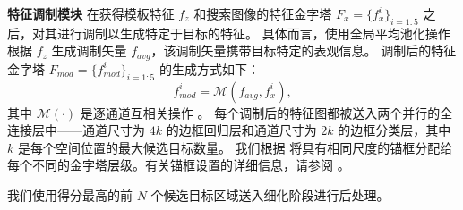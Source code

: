 \textbf{特征调制模块} 在获得模板特征 $f_{z}$ 和搜索图像的特征金字塔 $F_{x} = \{f_{x}^i\}_{i=1:5}$ 之后，对其进行调制以生成特定于目标的特征。
具体而言，使用全局平均池化操作根据 $f_{z}$ 生成调制矢量 $f_{avg}$，该调制矢量携带目标特定的表观信息。
调制后的特征金字塔 $F_{mod} = \{f_{mod}^i\}_{i=1:5}$ 的生成方式如下：
\begin{equation}
    f_{mod}^i = \mathcal{M}(f_{avg}, f^i_x),
\end{equation}
其中 $\mathcal M(\cdot)$ 是逐通道互相关操作 \cite{SiamRPN++}。
每个调制后的特征图都被送入两个并行的全连接层中——通道尺寸为 $4k$ 的边框回归层和通道尺寸为 $2k$ 的边框分类层，其中 $k$ 是每个空间位置的最大候选目标数量。
我们根据 \cite{lin2017feature} 将具有相同尺度的锚框分配给每个不同的金字塔层级。有关锚框设置的详细信息，请参阅 \cite{lin2017feature}。

我们使用得分最高的前 $N$ 个候选目标区域送入细化阶段进行后处理。

